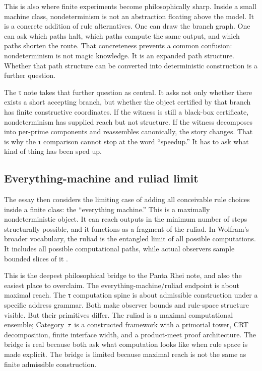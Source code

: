 \documentclass{pantarhei-researchnote}
\newcommand{\CategoryTau}{Category~\(\tau\)}
\begin{document}
This is also where finite experiments become philosophically sharp.
Inside a small machine class, nondeterminism is not an abstraction
floating above the model. It is a concrete addition of rule alternatives.
One can draw the branch graph. One can ask which paths halt, which paths
compute the same output, and which paths shorten the route. That
concreteness prevents a common confusion: nondeterminism is not magic
knowledge. It is an expanded path structure. Whether that path structure
can be converted into deterministic construction is a further question.

The τ note takes that further question as central. It asks not only
whether there exists a short accepting branch, but whether the object
certified by that branch has finite constructive coordinates. If the
witness is still a black-box certificate, nondeterminism has supplied
reach but not structure. If the witness decomposes into per-prime
components and reassembles canonically, the story changes. That is why
the τ comparison cannot stop at the word ``speedup.'' It has to ask what
kind of thing has been sped up.

\subsection{Everything-machine and ruliad limit}

The essay then considers the limiting case of adding all conceivable rule
choices inside a finite class: the ``everything machine.'' This is a
maximally nondeterministic object. It can reach outputs in the minimum
number of steps structurally possible, and it functions as a fragment of
the ruliad. In Wolfram's broader vocabulary, the ruliad is the entangled
limit of all possible computations. It includes all possible computational
paths, while actual observers sample bounded slices of it
\cite{Wolfram2026RuliologicalPNP}.

This is the deepest philosophical bridge to the Panta Rhei note, and also
the easiest place to overclaim. The everything-machine/ruliad endpoint is
about maximal reach. The τ computation spine is about admissible
construction under a specific address grammar. Both make observer bounds
and rule-space structure visible. But their primitives differ. The ruliad
is a maximal computational ensemble; \CategoryTau\ is a constructed
framework with a primorial tower, CRT decomposition, finite interface
width, and a product-meet proof architecture. The bridge is real because
both ask what computation looks like when rule space is made explicit. The
bridge is limited because maximal reach is not the same as finite
admissible construction.
\end{document}
